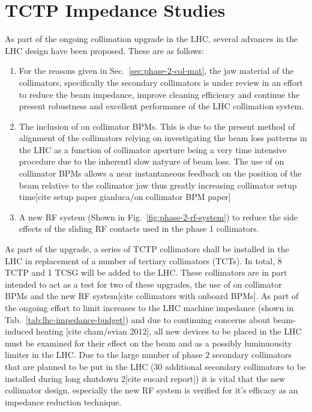 \section{TCTP Impedance Studies}

As part of the ongoing collimation upgrade in the LHC, several advances in the LHC design have been proposed. These are as follows:

\begin{enumerate}
\item{For the reasons given in Sec.~\ref{sec:phase-2-col-mat}, the jaw material of the collimators, specifically the secondary collimators is under review in an effort to reduce the beam impedance, improve cleaning efficiency and continue the present robustness and excellent performance of the LHC collimation system.}
\item{The inclusion of on collimator BPMs. This is due to the present method of alignment of the collimators relying on investigating the beam loss patterns in the LHC as a function of collimator aperture being a very time intensive procedure due to the inherentl slow natyure of beam loss. The use of on collimator BPMs allows a near instantaneous feedback on the position of the beam relative to the collimator jaw thus greatly increasing collimator setup time[cite setup paper gianluca/on collimator BPM paper]}
\item{A new RF system (Shown in Fig.~\ref{fig:phase-2-rf-system}) to reduce the side effects of the sliding RF contacts used in the phase 1 collimators.}
\end{enumerate}

As part of the upgrade, a series of TCTP collimators shall be installed in the LHC in replacement of a number of tertiary collimators (TCTs). In total, 8 TCTP and 1 TCSG will be added to the LHC. These collimators are in part intended to act as a test for two of these upgrades, the use of on collimator BPMs and the new RF system[cite collimators with onboard BPMs]. As part of the ongoing effort to limit increases to the LHC machine impedance (shown in Tab.~\ref{tab:lhc-impedance-budget}) and due to continuing concerns about beam-induced heating [cite cham/evian 2012], all new devices to be placed in the LHC must be examined for their effect on the beam and as a possibly luminuousity limiter in the LHC. Due to the large number of phase 2 secondary collimators that are planned to be put in the LHC (30 additional secondary collimators to be installed during long shutdown 2[cite eucard report]) it is vital that the new collimator design, especially the new RF system is verified for it's efficacy as an impedance reduction technique.  


